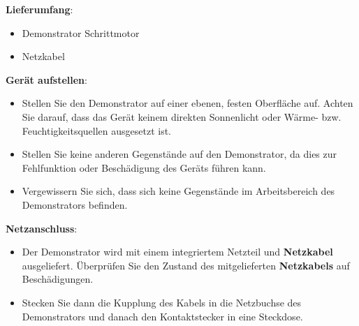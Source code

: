 \newpage
\textbf{Lieferumfang}: 
\begin{itemize}
\item Demonstrator Schrittmotor	
\item Netzkabel
	\end{itemize} 	
	\bigskip
	\textbf{Gerät aufstellen}: 
	\begin{itemize}
	\item Stellen Sie den Demonstrator auf einer ebenen, festen Oberfläche auf. Achten Sie darauf, dass das Gerät keinem direkten Sonnenlicht oder Wärme- bzw. Feuchtigkeitsquellen ausgesetzt ist. 
	\item Stellen Sie keine anderen Gegenstände auf den Demonstrator, da dies zur Fehlfunktion oder Beschädigung des Geräts führen kann. 
	\item Vergewissern Sie sich, dass sich keine Gegenstände im Arbeitsbereich des Demonstrators befinden.
	\end{itemize}
	\textbf{Netzanschluss}:
	\begin{itemize}
		\item Der Demonstrator wird mit einem integriertem Netzteil und \textbf{Netzkabel} ausgeliefert. Überprüfen Sie den Zustand des mitgelieferten \textbf{Netzkabels} auf Beschädigungen.
		\item Stecken Sie dann die Kupplung des Kabels in die Netzbuchse des Demonstrators und danach den Kontaktstecker in eine Steckdose. 
	\end{itemize} 



